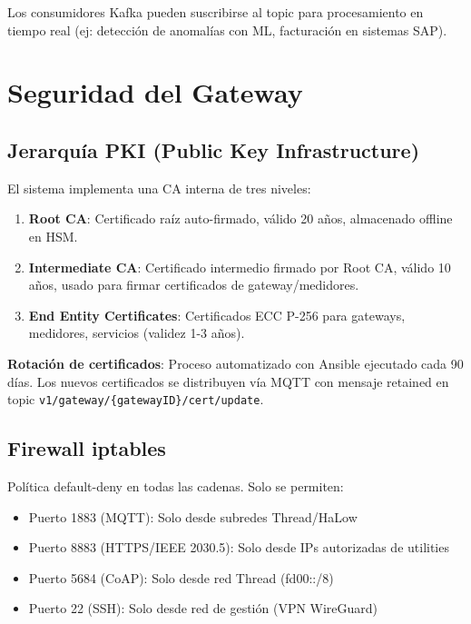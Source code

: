 Los consumidores Kafka pueden suscribirse al topic para procesamiento en tiempo real (ej: detección de anomalías con ML, facturación en sistemas SAP).

\section{Seguridad del Gateway}

\subsection{Jerarquía PKI (Public Key Infrastructure)}

El sistema implementa una CA interna de tres niveles:

\begin{enumerate}
    \item \textbf{Root CA}: Certificado raíz auto-firmado, válido 20 años, almacenado offline en HSM.
    \item \textbf{Intermediate CA}: Certificado intermedio firmado por Root CA, válido 10 años, usado para firmar certificados de gateway/medidores.
    \item \textbf{End Entity Certificates}: Certificados ECC P-256 para gateways, medidores, servicios (validez 1-3 años).
\end{enumerate}

\textbf{Rotación de certificados}: Proceso automatizado con Ansible ejecutado cada 90 días. Los nuevos certificados se distribuyen vía MQTT con mensaje retained en topic \texttt{v1/gateway/\{gatewayID\}/cert/update}.

\subsection{Firewall iptables}

Política default-deny en todas las cadenas. Solo se permiten:

\begin{itemize}
    \item Puerto 1883 (MQTT): Solo desde subredes Thread/HaLow
    \item Puerto 8883 (HTTPS/IEEE 2030.5): Solo desde IPs autorizadas de utilities
    \item Puerto 5684 (CoAP): Solo desde red Thread (fd00::/8)
    \item Puerto 22 (SSH): Solo desde red de gestión (VPN WireGuard)
\end{itemize}

